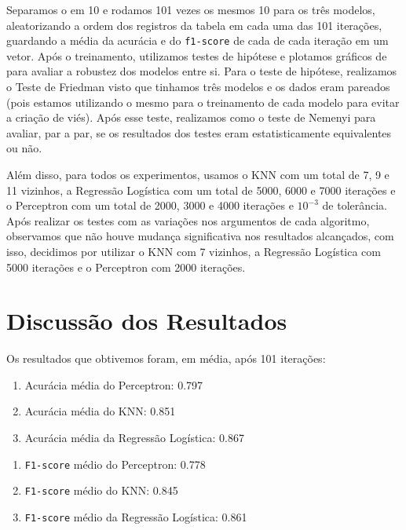   Separamos o  em 10  e rodamos 101 vezes os mesmos 10  para os três modelos, aleatorizando a ordem dos registros da tabela em cada uma das 101 iterações, guardando a média da acurácia e do \texttt{f1-score} de cada  de cada iteração em um vetor. Após o treinamento, utilizamos testes de hipótese e plotamos gráficos de  para avaliar a robustez dos modelos entre si. Para o teste de hipótese, realizamos o Teste de Friedman visto que tinhamos três modelos e os dados eram pareados (pois estamos utilizando o mesmo  para o treinamento de cada modelo para evitar a criação de viés). Após esse teste, realizamos como  o teste de Nemenyi para avaliar, par a par, se os resultados dos testes eram estatisticamente equivalentes ou não.

  Além disso, para todos os experimentos, usamos o KNN com um total de 7, 9 e 11 vizinhos, a Regressão Logística com um total de 5000, 6000 e 7000 iterações e o Perceptron com um total de 2000, 3000 e 4000 iterações e $10^{-3}$ de tolerância. Após realizar os testes com as variações nos argumentos de cada algoritmo, observamos que não houve mudança significativa nos resultados alcançados, com isso, decidimos por utilizar o KNN com 7 vizinhos, a Regressão Logística com 5000 iterações e o Perceptron com 2000 iterações.


\section{Discussão dos Resultados}

  Os resultados que obtivemos foram, em média, após 101 iterações:

  \begin{enumerate}
    \item Acurácia média do Perceptron: 0.797
    \item Acurácia média do KNN: 0.851
    \item Acurácia média da Regressão Logística: 0.867
  \end{enumerate}

  \begin{enumerate}
    \item \texttt{F1-score} médio do Perceptron: 0.778
    \item \texttt{F1-score} médio do KNN: 0.845
    \item \texttt{F1-score} médio da Regressão Logística: 0.861
  \end{enumerate}

